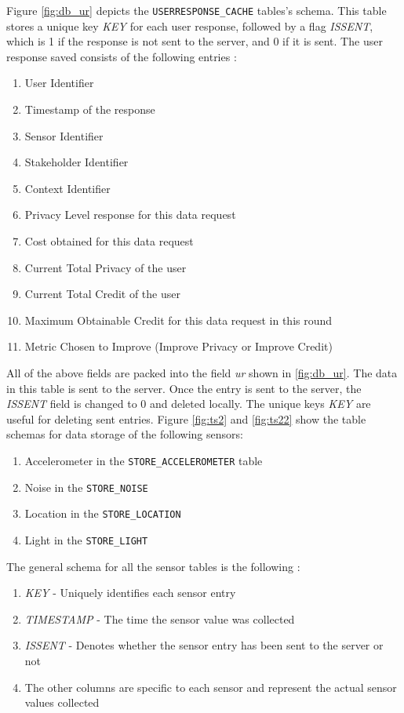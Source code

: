 Figure \ref{fig:db_ur} depicts the \texttt{USERRESPONSE\_CACHE} tables's schema. This table stores a unique key \textit{KEY} for each user response, followed by a flag \textit{ISSENT}, which is 1 if the response is not sent to the server, and 0 if it is sent. The user response saved consists of the following entries :

\begin{enumerate}
	\item User Identifier
	\item Timestamp of the response
    \item Sensor Identifier
    \item Stakeholder Identifier
    \item Context Identifier
    \item Privacy Level response for this data request
    \item Cost obtained for this data request
    \item Current Total Privacy of the user
    \item Current Total Credit of the user
    \item Maximum Obtainable Credit for this data request in this round
    \item Metric Chosen to Improve  (Improve Privacy or Improve Credit)
\end{enumerate}

All of the above fields are packed into the field \textit{ur} shown in \ref{fig:db_ur}. The data in this table is sent to the server. Once the entry is sent to the server, the \textit{ISSENT} field is changed to 0 and deleted locally. The unique keys \textit{KEY} are useful for deleting sent entries. Figure \ref{fig:ts2} and \ref{fig:ts22} show the table schemas for data storage of the following sensors:

\begin{enumerate}
	\item Accelerometer in the \texttt{STORE\_ACCELEROMETER} table
	\item Noise in the \texttt{STORE\_NOISE}
    \item Location in the  \texttt{STORE\_LOCATION}
    \item Light in the  \texttt{STORE\_LIGHT}
\end{enumerate}

The general schema for all the sensor tables is the following :

\begin{enumerate}
	\item \textit{KEY} - Uniquely identifies each sensor entry
	\item \textit{TIMESTAMP} - The time the sensor value was collected
    \item \textit{ISSENT} - Denotes whether the sensor entry has been sent to the server or not
    \item The other columns are specific to each sensor and represent the actual sensor values collected 
\end{enumerate}

